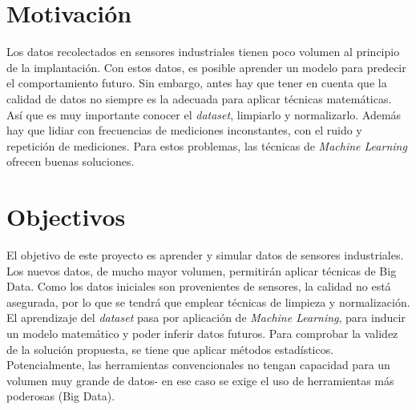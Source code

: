 \documentclass[11pt,spanish,listoffigures,listoftables]{tfgetsinf}
\begin{document}

\section{Motivaci\'on}

Los datos recolectados en sensores industriales tienen poco volumen al principio de la implantación. Con estos datos, es posible aprender un modelo para predecir el comportamiento futuro. Sin embargo, antes hay que tener en cuenta que la calidad de datos no siempre es la adecuada para aplicar técnicas matemáticas. Así que es muy importante conocer el {\em dataset}, limpiarlo y normalizarlo. Además hay que lidiar con frecuencias de mediciones inconstantes, con el ruido y repetición de mediciones. Para estos problemas, las técnicas de {\em Machine Learning} ofrecen buenas soluciones. 

\section{Objectivos}

El objetivo de este proyecto es aprender y simular datos de sensores industriales. Los nuevos datos, de mucho mayor volumen, permitirán aplicar técnicas de Big Data. Como los datos iniciales son provenientes de sensores, la calidad no está asegurada, por lo que se tendrá que emplear técnicas de limpieza y normalización. El aprendizaje del {\em dataset} pasa por aplicación de {\em Machine Learning}, para inducir un modelo matemático y poder inferir datos futuros. Para comprobar la validez de la solución propuesta, se tiene que aplicar métodos estadísticos. Potencialmente, las herramientas convencionales no tengan capacidad para un volumen muy grande de datos- en ese caso se exige el uso de herramientas más poderosas (Big Data).
\end{document}
